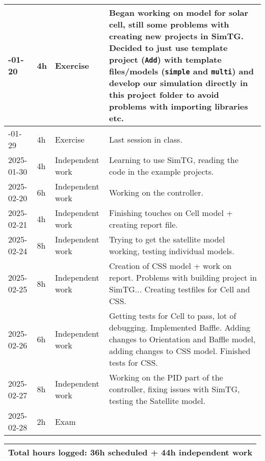\begin{appendices}
\begin{table}[H]
\begin{tabularx}{\textwidth} {
    | >{\hsize=0.3\hsize}X     %
    | >{\hsize=0.2\hsize}X     %
    | >{\hsize=0.3\hsize}X      %
    | >{\hsize=2.15\hsize}X      %
    |}
        2025-01-20 & 4h & Exercise &  Began working on model for solar cell, still some problems with creating new projects in SimTG. Decided to just use template project (\texttt{Add}) with template files/models (\texttt{simple} and \texttt{multi}) and develop our simulation directly in this project folder to avoid problems with importing libraries etc.     
        \\ \hline
        
        2025-01-29 & 4h & Exercise &  Last session in class.  \\ \hline

        2025-01-30 & 4h & Independent work & Learning to use SimTG, reading the code in the example projects. \\ \hline

        2025-02-20 & 6h & Independent work & Working on the controller. \\ \hline
        
        2025-02-21 & 4h & Independent work &  Finishing touches on Cell model + creating report file. \\ \hline

        2025-02-24 & 8h & Independent work & Trying to get the satellite model working, testing individual models. \\ \hline

        2025-02-25 & 8h & Independent work &  Creation of CSS model + work on report. Problems with building project in SimTG... Creating testfiles for Cell and CSS. \\ \hline

        2025-02-26 & 6h & Independent work &  Getting tests for Cell to pass, lot of debugging. Implemented Baffle. Adding changes to Orientation and Baffle model, adding changes to CSS model. Finished tests for CSS. \\ \hline

        2025-02-27 & 8h & Independent work & Working on the PID part of the controller, fixing issues with SimTG, testing the Satellite model. \\ \hline
        
        2025-02-28 & 2h & Exam &    \\ \hline
    \end{tabularx}
    \begin{tabularx}{\textwidth} {|X|}
         \hline
         \textbf{Total hours logged: 36h scheduled + 44h independent work} \\ \hline
    \end{tabularx}


\end{table}
\end{appendices}
